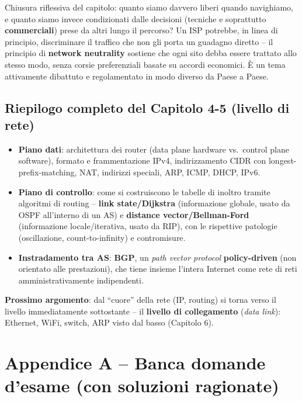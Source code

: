 \documentclass[12pt, a4paper]{article}
\begin{document}
Chiusura riflessiva del capitolo: quanto siamo davvero liberi quando navighiamo, e quanto siamo invece condizionati dalle decisioni (tecniche e soprattutto \textbf{commerciali}) prese da altri lungo il percorso? Un ISP potrebbe, in linea di principio, discriminare il traffico che non gli porta un guadagno diretto -- il principio di \textbf{network neutrality} sostiene che ogni sito debba essere trattato allo stesso modo, senza corsie preferenziali basate su accordi economici. È un tema attivamente dibattuto e regolamentato in modo diverso da Paese a Paese.

\subsection{Riepilogo completo del Capitolo 4-5 (livello di rete)}

\begin{itemize}
    \item \textbf{Piano dati}: architettura dei router (data plane hardware vs.\ control plane software), formato e frammentazione IPv4, indirizzamento CIDR con longest-prefix-matching, NAT, indirizzi speciali, ARP, ICMP, DHCP, IPv6.
    \item \textbf{Piano di controllo}: come si costruiscono le tabelle di inoltro tramite algoritmi di routing -- \textbf{link state/Dijkstra} (informazione globale, usato da OSPF all'interno di un AS) e \textbf{distance vector/Bellman-Ford} (informazione locale/iterativa, usato da RIP), con le rispettive patologie (oscillazione, count-to-infinity) e contromisure.
    \item \textbf{Instradamento tra AS}: \textbf{BGP}, un \textit{path vector protocol} \textbf{policy-driven} (non orientato alle prestazioni), che tiene insieme l'intera Internet come rete di reti amministrativamente indipendenti.
\end{itemize}

\textcolor{blue!70!black}{\textbf{Prossimo argomento}}: dal ``cuore'' della rete (IP, routing) si torna verso il livello immediatamente sottostante -- il \textbf{livello di collegamento} (\textit{data link}): Ethernet, WiFi, switch, ARP visto dal basso (Capitolo 6).


\section*{Appendice A -- Banca domande d'esame (con soluzioni ragionate)}
\end{document}
